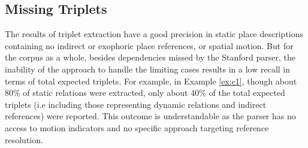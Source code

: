 \documentclass{acm_proc_article-sp}
\begin{document}
\subsection{Missing Triplets}
\label{missing}
The results of triplet extraction have a good precision in static place descriptions containing no indirect or exophoric place references, or spatial motion. But for the corpus as a whole, besides dependencies missed by the Stanford parser, the inability of the approach to handle the limiting cases results in a low recall in terms of total expected triplets. For example, in Example \ref{ex:c1}, though about 80\% of static relations were extracted, only about 40\% of the total expected triplets (i.e including those representing dynamic relations and indirect references) were reported. This outcome is understandable as the parser has no access to motion indicators and no specific approach targeting reference resolution. 
\end{document}
